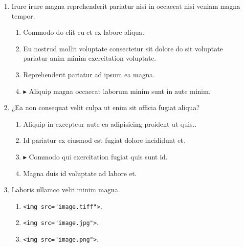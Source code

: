 \documentclass[a4paper,12pt]{article}
\begin{document}
\begin{enumerate}[label=\textbf{\arabic*.}]
\item Irure irure magna reprehenderit pariatur nisi in occaecat nisi veniam magna tempor.
\begin{multicols}{2}
	\begin{enumerate}
		\item  Commodo do elit eu et ex labore aliqua.
    
		\item  Eu nostrud mollit voluptate consectetur sit dolore do sit voluptate pariatur anim minim exercitation voluptate.
    
		\item  Reprehenderit pariatur ad ipsum ea magna.
  
		\item $\blacktriangleright$  Aliquip magna occaecat laborum minim sunt in aute minim.
    
	\end{enumerate}

\end{multicols}
\item ¿Ea non consequat velit culpa ut enim sit officia fugiat aliqua?
\begin{multicols}{2}
	\begin{enumerate}
		\item  Aliquip in excepteur aute ea adipisicing proident ut quis..
    
		\item  Id pariatur ex eiusmod est fugiat dolore incididunt et.
    
		\item $\blacktriangleright$  Commodo qui exercitation fugiat quis sunt id.
    
		\item  Magna duis id voluptate ad labore et.
  
	\end{enumerate}

\end{multicols}
\item Laboris ullamco velit minim magna.
	\begin{enumerate}
		\item  \texttt{<img src="{}image.tiff"{}>}.
  
		\item  \texttt{<img src="{}image.jpg"{}>}.
    
		\item  \texttt{<img src="{}image.png"{}>}.
    

\end{enumerate}
\end{enumerate}
\end{document}
